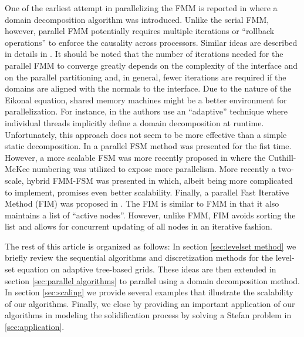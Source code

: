 One of the earliest attempt in parallelizing the FMM is reported in \cite{Herrmann:03:A-domain-decompositi} where a domain decomposition algorithm was introduced. Unlike the serial FMM, however, parallel FMM potentially requires multiple iterations or ``rollback operations'' to enforce the causality across processors. Similar ideas are described in details in \cite{Tugurlan:08:Fast-marching-method}. It should be noted that the number of iterations needed for the parallel FMM to converge greatly depends on the complexity of the interface and on the parallel partitioning and, in general, fewer iterations are required if the domains are aligned with the normals to the interface. Due to the nature of the Eikonal equation, shared memory machines might be a better environment for parallelization. For instance, in \cite{Breus;Cristiani;Gwosdek;etal:11:An-adaptive-domain-d} the authors use an ``adaptive'' technique where individual threads implicitly define a domain decomposition at runtime. Unfortunately, this approach does not seem to be more effective than a simple static decomposition. In \cite{Zhao:07:Parallel-implementat} a parallel FSM method was presented for the fist time. However, a more scalable FSM was more recently proposed in \cite{Detrixhe;Gibou;Min:13:A-parallel-fast-swee} where the Cuthill-McKee numbering was utilized to expose more parallelism. More recently a two-scale, hybrid FMM-FSM was presented in \cite{Chacon;Vladimirsky:13:A-parallel-Heap-Cell} which, albeit being more complicated to implement, promises even better scalability. Finally, a parallel Fast Iterative Method (FIM) was proposed in \cite{Jeong;Whitaker:08:A-fast-iterative-met}. The FIM is similar to FMM in that it also maintains a list of ``active nodes''. However, unlike FMM, FIM avoids sorting the list and allows for concurrent updating of all nodes in an iterative fashion. 

The rest of this article is organized as follows: In section \ref{sec:levelset method} we briefly review the sequential algorithms and discretization methods for the level-set equation on adaptive tree-based grids. These ideas are then extended in section \ref{sec:parallel algorithms} to parallel using a domain decomposition method. In section \ref{sec:scaling} we provide several examples that illustrate the scalability of our algorithms. Finally, we close by providing an important application of our algorithms in modeling the solidification process by solving a Stefan problem in \ref{sec:application}.

